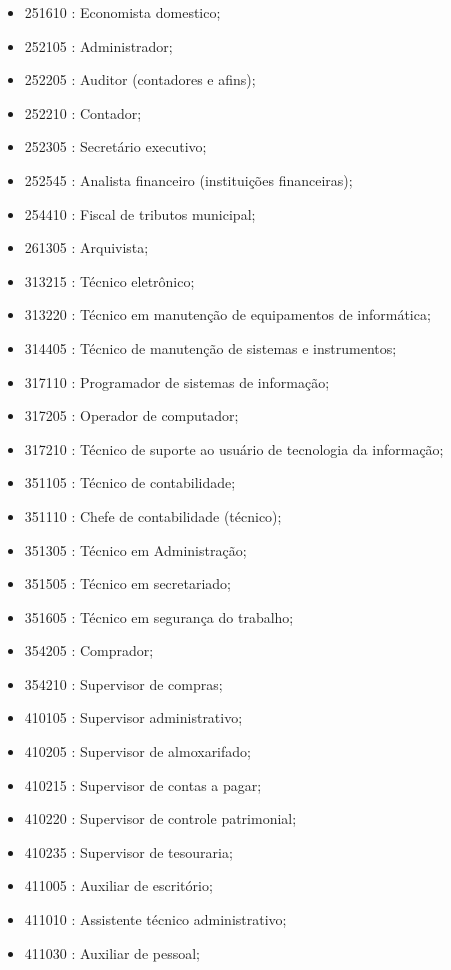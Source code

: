 \begin{itemize}
\begin{itemize}
\begin{itemize}
      \item 251610 : Economista domestico;
      \item 252105 : Administrador;
      \item 252205 : Auditor (contadores e afins);
      \item 252210 : Contador;
      \item 252305 : Secretário executivo;
      \item 252545 : Analista financeiro (instituições financeiras);
      \item 254410 : Fiscal de tributos municipal;
      \item 261305 : Arquivista;
      \item 313215 : Técnico eletrônico;
      \item 313220 : Técnico em manutenção de equipamentos de informática;
      \item 314405 : Técnico de manutenção de sistemas e instrumentos;
      \item 317110 : Programador de sistemas de informação;
      \item 317205 : Operador de computador;
      \item 317210 : Técnico de suporte ao usuário de tecnologia da informação;
      \item 351105 : Técnico de contabilidade;
      \item 351110 : Chefe de contabilidade (técnico);
      \item 351305 : Técnico em Administração;
      \item 351505 : Técnico em secretariado;
      \item 351605 : Técnico em segurança do trabalho;
      \item 354205 : Comprador;
      \item 354210 : Supervisor de compras;
      \item 410105 : Supervisor administrativo;
      \item 410205 : Supervisor de almoxarifado;
      \item 410215 : Supervisor de contas a pagar;
      \item 410220 : Supervisor de controle patrimonial;
      \item 410235 : Supervisor de tesouraria;
      \item 411005 : Auxiliar de escritório;
      \item 411010 : Assistente técnico administrativo;
      \item 411030 : Auxiliar de pessoal;

\end{itemize}
\end{itemize}
\end{itemize}
